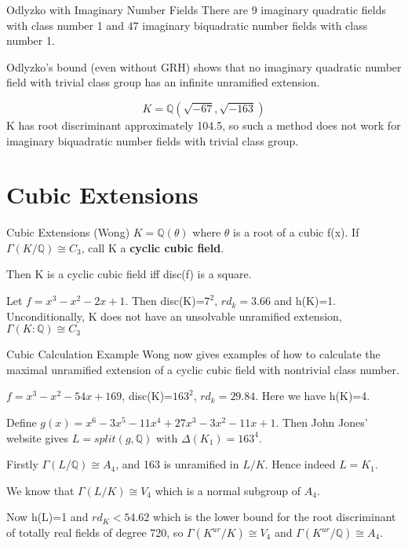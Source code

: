 \documentclass[10pt]{beamer}
\newcommand{\q}{\mathbb{Q}}
\theoremstyle{plain} %
\begin{document}
\begin{frame}{Odlyzko with Imaginary Number Fields}
    There are 9 imaginary quadratic fields with class number 1 and 47 imaginary biquadratic number fields with class number 1. \par Odlyzko's bound (even without GRH) shows that no imaginary quadratic number field with trivial class group has an infinite unramified extension. 
    \begin{example}
          \begin{equation}
        K=\q(\sqrt{-67},\sqrt{-163})
    \end{equation}
    K has root discriminant approximately 104.5, so such a method does not work for imaginary biquadratic number fields with trivial class group.
    \end{example}

\end{frame}
\section{Cubic Extensions}
\begin{frame}{Cubic Extensions (Wong) }
 $K=\mathbb{Q}(\theta)$ where $\theta$ is a root of a cubic
f(x). If $\Gamma(K/\mathbb{Q}) \cong C_3$, call K a  \textbf{cyclic cubic field}.
\begin{theorem}
Then K is a cyclic cubic field iff disc(f) is a square. 
\end{theorem}
\begin{example}
    Let $f=x^3-x^2-2x+1$. Then disc(K)=$7^2$, $rd_{k}=3.66$ and h(K)=1. Unconditionally, K does not have an unsolvable unramified extension, $\Gamma(K:\mathbb{Q})\cong C_3$
\end{example}
\end{frame}

\begin{frame}{Cubic Calculation Example}
    Wong now gives examples of how to calculate the maximal unramified extension of a cyclic cubic field with nontrivial class number. \begin{example}
    $f=x^3-x^2-54x+169$, disc(K)=$163^2$, $rd_{k}=29.84$. Here we have h(K)=4.\par Define $g(x)=x^6-3x^5-11x^4+27x^3-3x^2-11x+1$. Then John Jones' website gives $L = split(g,\mathbb{Q})$ with $\Delta(K_1)=163^4$.\par Firstly $\Gamma(L/\mathbb{Q}) \cong A_4$, and 163 is unramified in $L/K$. Hence indeed $L=K_1$.\par  We know that $\Gamma(L/K)\cong V_4$ which is a normal subgroup of $A_4$. \par Now h(L)=1 and $rd_K < 54.62$ which is the lower bound for the root discriminant of totally real fields of degree 720, so $\Gamma(K^{ur}/K) \cong V_4$ and $\Gamma(K^{ur}/\mathbb{Q}) \cong A_4$. 
\end{example}
\end{frame}
\end{document}
